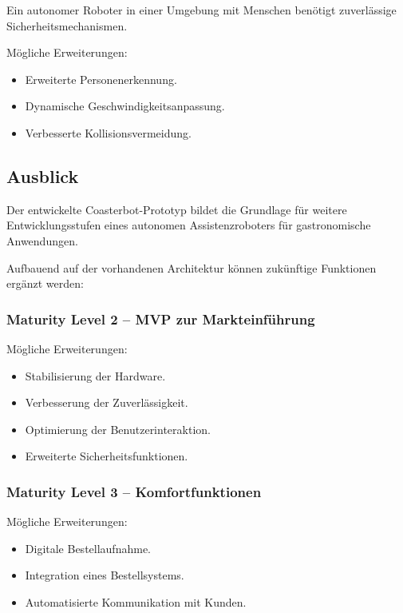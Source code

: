 Ein autonomer Roboter in einer Umgebung mit Menschen benötigt
zuverlässige Sicherheitsmechanismen.

Mögliche Erweiterungen:

\begin{itemize}
\tightlist
\item
  Erweiterte Personenerkennung.
\item
  Dynamische Geschwindigkeitsanpassung.
\item
  Verbesserte Kollisionsvermeidung.
\end{itemize}

\subsection{Ausblick}\label{ausblick}

Der entwickelte Coasterbot-Prototyp bildet die Grundlage für weitere
Entwicklungsstufen eines autonomen Assistenzroboters für gastronomische
Anwendungen.

Aufbauend auf der vorhandenen Architektur können zukünftige Funktionen
ergänzt werden:

\subsubsection{Maturity Level 2 -- MVP zur
Markteinführung}\label{maturity-level-2-mvp-zur-markteinfuxfchrung}

Mögliche Erweiterungen:

\begin{itemize}
\tightlist
\item
  Stabilisierung der Hardware.
\item
  Verbesserung der Zuverlässigkeit.
\item
  Optimierung der Benutzerinteraktion.
\item
  Erweiterte Sicherheitsfunktionen.
\end{itemize}

\subsubsection{Maturity Level 3 --
Komfortfunktionen}\label{maturity-level-3-komfortfunktionen}

Mögliche Erweiterungen:

\begin{itemize}
\tightlist
\item
  Digitale Bestellaufnahme.
\item
  Integration eines Bestellsystems.
\item
  Automatisierte Kommunikation mit Kunden.
\end{itemize}

